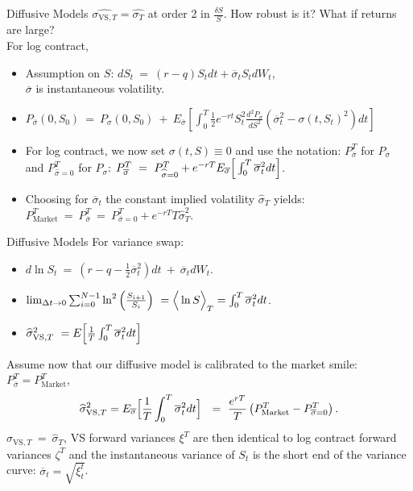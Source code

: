 \documentclass{beamer}
\begin{document}
    \begin{frame}{Diffusive Models}
    $\hat{\sigma_{\text{VS},T}} = \hat{\sigma_{T}}$ at order 2 in $\frac{\delta S}{S}$. How robust is it? What if returns are large? \\
    For log contract,
        \begin{itemize}
            \item Assumption on $S$:
            $dS_{t}\ =\ (r-q)S_{t}dt+\overline{\sigma}_{t}S_{t}dW_{t}$,\\ $\overline{\sigma}$ is instantaneous volatility.
            \item  $P_{\overline{\sigma}}\left(0,S_{0}\right)\ =\ P_{\sigma}\left(0,S_{0}\right)\ +\ E_{\overline{\sigma}}\left[\int_{0}^{T}\frac{1}{2}e^{-rt}S_{t}^{2}\frac{d^ {2}P_{\sigma}}{dS^{2}}\left(\overline{\sigma}_{t}^{2}-\sigma(t,S_{t})^{2} \right)dt\right]$
            \item For log contract, we now set \(\sigma\left(t,S\right)\equiv 0\) and use the notation: \(P_{\overline{\sigma}}^{T}\) for \(P_{\overline{\sigma}}\) and \(P_{\widehat{\sigma}=0}^{T}\) for \(P_{\sigma}\):
            $P_{\overline{\sigma}}^{T}\ =\ P_{\widehat{\sigma}=0}^{T}+e^{-rT}E_{\overline{ \sigma}}\Big{[}\int_{0}^{T}\overline{\sigma}_{t}^{2}dt\Big{]}$.
            \item Choosing for \(\overline{\sigma}_{t}\) the constant implied volatility \(\widehat{\sigma}_{T}\) yields:
            $P_{\mathrm{Market}}^{T}\ =\ P_{\overline{\sigma}}^{T}\ =\ P_{\overline{\sigma}=0}^{T}+e^{-rT}T \widehat{\sigma}_{T}^{2}$.
        \end{itemize}
    \end{frame}
    \begin{frame}{Diffusive Models}
        For variance swap:
        \begin{itemize}
            \item $d\ln S_{t}\ =\ (r-q-\frac{1}{2}\overline{\sigma}_{t}^{2})dt\ +\ \overline{\sigma}_{t}dW_{t}$.
            \item $\lim_{\Delta t\to 0}\sum_{i=0}^{N-1}\ln^{2}\Big{(}\frac{S_{i+1}}{S_{i}}\Big{)}\ 
            =\Big{<}\ln S\Big{>}_{T} 
            =\int_{0}^{T}\overline{\sigma}_{t}^{2}dt$.
            \item $\widehat{\sigma}_{\mathrm{VS},T}^{2}\  =E\Big{[}\frac{1}{T}\int_{0}^{T}\overline{\sigma}_{t}^{2}dt\Big{]}$
        \end{itemize}
    Assume now that our diffusive model is calibrated to the market smile: \(P_{\overline{\sigma}}^{T}=P_{\mathrm{Market}}^{T}\),
    $$\widehat{\sigma}_{\mathrm{VS},T}^{2} = E_{\overline{\sigma}}\Big{[}\frac{1}{T}\int_{0}^{T}\overline{ \sigma}_{t}^{2}dt\Big{]}\ \ =\ \frac{e^{rT}}{T}\left(P_{\mathrm{Market}}^{T}-P_{\overline{\sigma}=0}^{T}\right).$$
    $\widehat{\sigma}_{\mathrm{VS},T}\ =\ \widehat{\sigma}_{T}$, VS forward variances \(\xi^{T}\) are then identical to log contract forward variances \(\zeta^{T}\) and the instantaneous variance of \(S_{t}\) is the short end of the variance curve: \(\overline{\sigma}_{t}=\sqrt{\xi_{t}^{t}}\).
    \end{frame}
\end{document}
